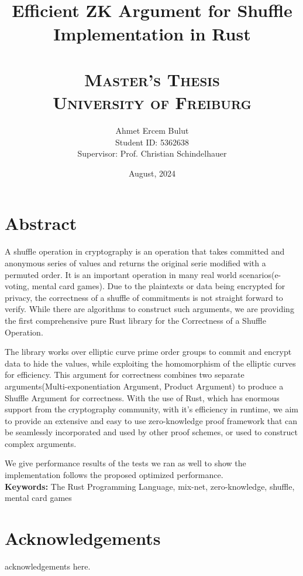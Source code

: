\documentclass[12pt,a4paper]{report}
\title{
    \HRule \\[0.4cm]
    {\huge \bfseries  Efficient ZK Argument for Shuffle Implementation in Rust \\[0.4cm]}
    \HRule \\[1.5cm]
    \textsc{\Large Master's Thesis}\\[0.5cm]
    \textsc{\large University of Freiburg}\\[0.5cm]
}
\author{
    \Large Ahmet Ercem Bulut\\
    \Large Student ID: 5362638\\
    \Large Supervisor: Prof. Christian Schindelhauer
}
\date{August, 2024}
\begin{document}
\maketitle
\thispagestyle{empty}
\newpage

\chapter*{Abstract}
A shuffle operation in cryptography is an operation that takes committed and anonymous series of values and returns the original serie modified with a permuted order. 
It is an important operation in many real world scenarios(e-voting, mental card games).
Due to the plaintexts or data being encrypted for privacy, the correctness of a shuffle of commitments is not straight 
forward to verify. While there are algorithms to construct such arguments, we are providing the first comprehensive 
pure Rust library for the Correctness of a Shuffle Operation.\par
The library works over elliptic curve prime order groups 
to commit and encrypt data to hide the values, while exploiting the homomorphism of the elliptic curves for efficiency.
This argument for correctness combines two separate arguments(Multi-exponentiation Argument, Product Argument) to produce a Shuffle Argument for correctness. 
With the use of Rust, which has enormous support from the cryptography community, with it’s efficiency in runtime, 
we aim to provide an extensive and easy to use zero-knowledge proof
framework that can be seamlessly incorporated and used by other proof schemes, or used to construct complex arguments.\par
We give performance results of the tests we ran as well to show the implementation follows the proposed optimized performance.\\

\textbf{Keywords:} The Rust Programming Language, mix-net, zero-knowledge, shuffle, mental card games

\newpage

\chapter*{Acknowledgements}
acknowledgements here.

\newpage

\tableofcontents
\end{document}
